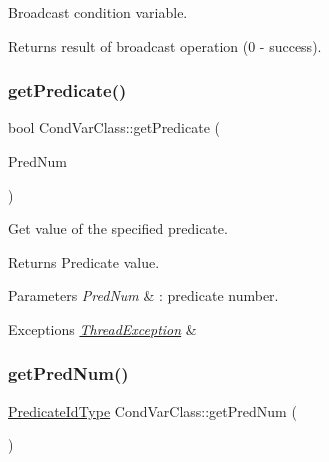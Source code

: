 Broadcast condition variable. \begin{DoxyReturn}{Returns}
result of broadcast operation (0 -\/ success). 
\end{DoxyReturn}
\mbox{\label{classCondVarClass_a9511628fc388d3e8a3d35bd2d9daacb7}} 
\subsubsection{\texorpdfstring{get\+Predicate()}{getPredicate()}}
{\footnotesize\ttfamily bool Cond\+Var\+Class\+::get\+Predicate (\begin{DoxyParamCaption}\item[{\hyperlink{classCondVarClass_a8e27f99972b8b95f064d6657a4583a5b}{Predicate\+Id\+Type}}]{Pred\+Num }\end{DoxyParamCaption})\hspace{0.3cm}{\ttfamily [noexcept]}}

Get value of the specified predicate. \begin{DoxyReturn}{Returns}
Predicate value. 
\end{DoxyReturn}

\begin{DoxyParams}{Parameters}
{\em Pred\+Num} & \+: predicate number. \\
\hline
\end{DoxyParams}

\begin{DoxyExceptions}{Exceptions}
{\em \hyperlink{classThreadException}{Thread\+Exception}} & \\
\hline
\end{DoxyExceptions}
\mbox{\label{classCondVarClass_adf7a6eb861c7fdd02767239680726456}} 
\subsubsection{\texorpdfstring{get\+Pred\+Num()}{getPredNum()}}
{\footnotesize\ttfamily \hyperlink{classCondVarClass_a8e27f99972b8b95f064d6657a4583a5b}{Predicate\+Id\+Type} Cond\+Var\+Class\+::get\+Pred\+Num (\begin{DoxyParamCaption}{ }\end{DoxyParamCaption})\hspace{0.3cm}{\ttfamily [inline]}}

